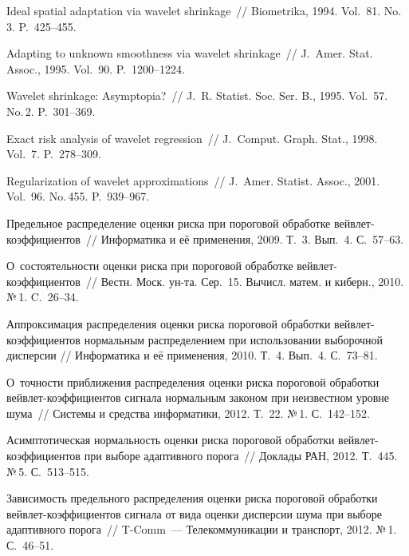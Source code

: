 \begin{multicols}{2}
{\small\frenchspacing
{%
\begin{thebibliography}{99}


 Ideal spatial adaptation via
wavelet shrinkage~// Biometrika, 1994. Vol.~81. No.\,3.
P.~425--455.

 Adapting to unknown
smoothness via wavelet shrinkage~// J.~Amer. Stat. Assoc., 1995.
Vol.~90. P.~1200--1224.

Wavelet shrinkage: Asymp\-to\-pia?~// J.~R. Statist. Soc. Ser.
B., 1995. Vol.~57. No.\,2. P.~301--369.

 Exact risk analysis of wavelet regression~// J.~Comput.
Graph. Stat., 1998. Vol.~7. P.~278--309.

 Regularization of wavelet
approximations~// J.~Amer. Statist. Assoc., 2001. Vol.~96. No.\,455. P.~939--967.

 Предельное распределение оценки риска при
пороговой обработке вейв\-лет-ко\-эф\-фи\-ци\-ен\-тов~// Информатика и её
применения, 2009. Т.~3. Вып.~4. С.~57--63.

 О~состоятельности оценки
риска при пороговой обработке вейв\-лет-ко\-эф\-фи\-ци\-ен\-тов~// Вестн. Моск.
ун-та. Сер.~15. Вычисл. матем. и киберн., 2010. №\,1. C.~26--34.

 Аппроксимация распределения оценки риска
пороговой обработки вейв\-лет-ко\-эф\-фи\-ци\-ен\-тов нормальным распределением
при использовании выборочной дисперсии // Информатика и её
применения, 2010. Т.~4. Вып.~4. С.~73--81.

 О~точности приближения распределения оценки риска пороговой обработки 
вейв\-лет-ко\-эф\-фи\-ци\-ен\-тов
сигнала нормальным законом при неизвестном уровне шума~// 
Системы и средства информатики, 2012. Т.~22. №\,1. С.~142--152.

  Асимптотическая нормальность оценки риска пороговой обработки 
вейв\-лет-ко\-эф\-фи\-ци\-ен\-тов при выборе
адаптивного порога~// Доклады РАН, 2012. Т.~445. №\,5. С.~513--515.

 Зависимость предельного распределения
оценки риска пороговой обработки вейв\-лет-ко\-эф\-фи\-ци\-ен\-тов сигнала от
вида оценки дисперсии шума при выборе адаптивного порога~// T-Comm~--- 
Телекоммуникации и транспорт, 2012. №\,1. С.~46--51.


\end{thebibliography}}}
\end{multicols}
